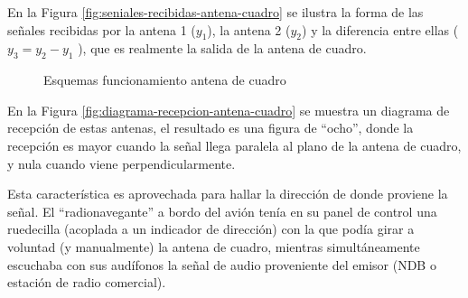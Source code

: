  En la Figura \ref{fig:seniales-recibidas-antena-cuadro} se ilustra la forma de las se\~nales recibidas por la antena 1 ($y_1$), la antena 2 ($y_2$) y la diferencia entre ellas ( $y_3 = y_2 - y_1$ ), que es realmente la salida de la antena de cuadro.

\begin{figure}[!h]
  \centering

  \caption{Esquemas funcionamiento antena de cuadro}
\end{figure}

En la Figura \ref{fig:diagrama-recepcion-antena-cuadro} se muestra un diagrama de recepci\'on de estas antenas, el resultado es una figura de ``ocho'', donde la recepci\'on es mayor cuando la se\~nal llega paralela al plano de la antena de cuadro, y nula cuando viene perpendicularmente.


Esta caracter\'istica es aprovechada para hallar la direcci\'on de donde proviene la se\~nal. El ``radionavegante'' a bordo del avi\'on ten\'ia en su panel de control una ruedecilla (acoplada a un indicador de direcci\'on) con la que pod\'ia girar a voluntad (y manualmente) la antena de cuadro, mientras simult\'aneamente escuchaba con sus aud\'ifonos la se\~nal de audio proveniente del emisor (NDB o estaci\'on de radio comercial).


